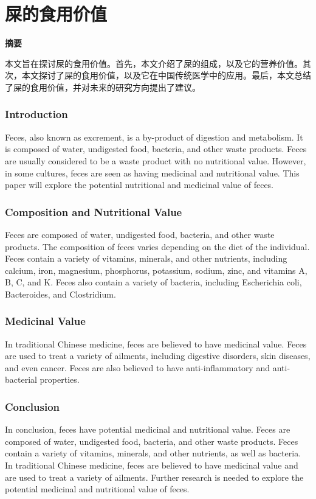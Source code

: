 \documentclass[titlepage,oneside]{ctexbook}
\begin{document}
\chapter{屎的食用价值}

\begin{center}
    \textbf{摘要}
\end{center}

本文旨在探讨屎的食用价值。首先，本文介绍了屎的组成，以及它的营养价值。其次，本文探讨了屎的食用价值，以及它在中国传统医学中的应用。最后，本文总结了屎的食用价值，并对未来的研究方向提出了建议。

\subsection*{Introduction}

Feces, also known as excrement, is a by-product of digestion and metabolism. It is composed of water, undigested food, bacteria, and other waste products. Feces are usually considered to be a waste product with no nutritional value. However, in some cultures, feces are seen as having medicinal and nutritional value. This paper will explore the potential nutritional and medicinal value of feces.

\subsection*{Composition and Nutritional Value}
Feces are composed of water, undigested food, bacteria, and other waste products. The composition of feces varies depending on the diet of the individual. Feces contain a variety of vitamins, minerals, and other nutrients, including calcium, iron, magnesium, phosphorus, potassium, sodium, zinc, and vitamins A, B, C, and K. Feces also contain a variety of bacteria, including Escherichia coli, Bacteroides, and Clostridium.


\subsection*{Medicinal Value}
In traditional Chinese medicine, feces are believed to have medicinal value. Feces are used to treat a variety of ailments, including digestive disorders, skin diseases, and even cancer. Feces are also believed to have anti-inflammatory and anti-bacterial properties.

\subsection*{Conclusion}
In conclusion, feces have potential medicinal and nutritional value. Feces are composed of water, undigested food, bacteria, and other waste products. Feces contain a variety of vitamins, minerals, and other nutrients, as well as bacteria. In traditional Chinese medicine, feces are believed to have medicinal value and are used to treat a variety of ailments. Further research is needed to explore the potential medicinal and nutritional value of feces.
\end{document}
